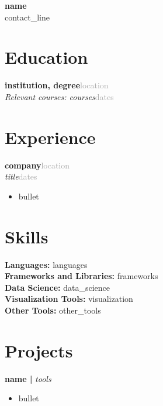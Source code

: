 \documentclass[10pt, letterpaper]{article}
\begin{document}
\begin{center}
  {\LARGE\bfseries\color{navy} {{name}}}\\[2pt]
  {\small\color{darkgray} {{contact_line}}}
\end{center}
\vspace{-4pt}

\section*{Education}

\noindent\textbf{{{institution}}, {{degree}}}\hfill\textcolor{darkgray}{{{location}}}\\[-2pt]
\noindent \textit{Relevant courses: {{courses}}}\hfill\textcolor{darkgray}{{{dates}}}

\vspace{3pt}

\section*{Experience}

\noindent\textbf{{{company}}}\hfill\textcolor{darkgray}{{{location}}}\\[-2pt]
\noindent \textit{{{title}}}\hfill\textcolor{darkgray}{{{dates}}}
\begin{itemize}[leftmargin=1.5em, topsep=1pt, itemsep=0pt, parsep=0pt]
  \item {{bullet}}
\end{itemize}
\vspace{1pt}


\section*{Skills}
\noindent\textbf{Languages:} {{languages}}\\
\noindent\textbf{Frameworks and Libraries:} {{frameworks}}\\
\noindent\textbf{Data Science:} {{data_science}}\\
\noindent\textbf{Visualization Tools:} {{visualization}}\\
\noindent\textbf{Other Tools:} {{other_tools}}

\section*{Projects}

\noindent\textbf{{{name}} | }\textit{{{tools}}}
\begin{itemize}[leftmargin=1.5em, topsep=1pt, itemsep=0pt, parsep=0pt]
  \item {{bullet}}
\end{itemize}
\vspace{1pt}

\end{document}
